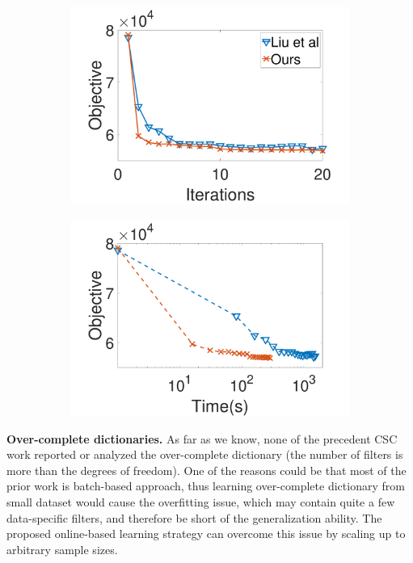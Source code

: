 \begin{figure}[h]
\begin{subfigure}{0.45\textwidth}
  \includegraphics[width=1\linewidth]{figure/iteVSobjOnline.pdf}
\end{subfigure}
\begin{subfigure}{0.45\textwidth}
  \includegraphics[width=1\linewidth]{figure/timeVSobjOnline.pdf}
\end{subfigure}

\caption{}
\label{fig:onlineConvergence}
\end{figure}

{\bfseries Over-complete dictionaries.} As far as we know, none of the precedent CSC work reported or analyzed the over-complete dictionary (the number of filters is more than the degrees of freedom). One of the reasons could be that most of the prior work is batch-based approach, thus learning over-complete dictionary from small dataset would cause the overfitting issue, which may contain quite a few data-specific filters, and therefore be short of the generalization ability. The proposed online-based learning strategy can overcome this issue by scaling up to arbitrary sample sizes. 

